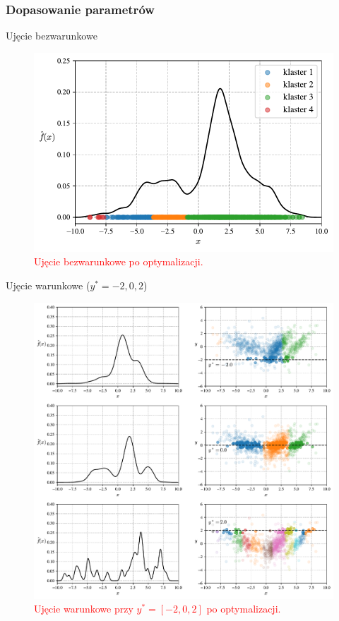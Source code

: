 \documentclass[12pt,a4paper,oneside]{book}
\theoremstyle{definition}
\begin{document}
\newpage
\subsubsection*{Dopasowanie parametrów}

Ujęcie bezwarunkowe
\begin{figure}[H]
    \centering
    \includegraphics[scale=0.7]{synthetic_data_clustering_kde2}
    \vspace{-0.5cm} 
    \caption{\textcolor{red}{Ujęcie bezwarunkowe po optymalizacji.}}
\end{figure}

\noindent Ujęcie warunkowe ($y^*=-2,0,2$)
\begin{figure}[H]
    \centering
    \includegraphics[scale=0.5]{synthetic_data_clustering_ckde2}
    \vspace{-0.5cm} 
    \caption{\textcolor{red}{Ujęcie warunkowe przy $y^*=[-2,0,2]$ po optymalizacji.}}
\end{figure}
\end{document}
